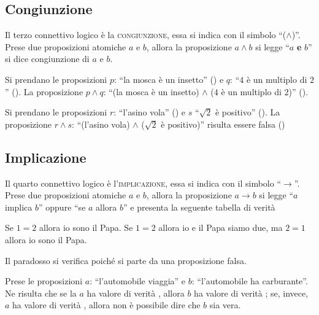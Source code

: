 \subsection{Congiunzione}\label{subsec:congiunzione}
Il terzo connettivo logico è la \textsc{congiunzione}, essa si indica con il simbolo ``(\(\land\))''. Prese due proposizioni atomiche \(a\) e \(b\), allora la proposizione \(a \land b\) si legge ``\(a\) \textbf{e} \(b\)'' si dice congiunzione di \(a\) e \(b\).



\begin{example}
    Si prendano le proposizioni \(p\): ``la mosca è un insetto'' (\true) e \(q\): ``\(4\) è un multiplo di \(2\)'' (\true). La proposizione \(p \land q\): ``(la mosca è un insetto) \(\land\) (\(4\) è un multiplo di \(2\))'' (\true).
\end{example}

\begin{example}
    Si prendano le proposizioni \(r\): ``l'asino vola'' (\false) e \(s\) ``\(\sqrt{2}\) è positivo'' (\true). La proposizione \(r \land s\): ``(l'asino vola) \(\land\) (\(\sqrt{2}\) è positivo)'' risulta essere falsa (\false)
\end{example}


\subsection{Implicazione}\label{subsec:implicazione}
Il quarto connettivo logico è l'\textsc{implicazione}, essa si indica con il simbolo ``\(\longrightarrow\)''. Prese due proposizioni atomiche \(a\) e \(b\), allora la proposizione \(a \longrightarrow b\) si legge ``\(a\) implica \(b\)'' oppure ``se \(a\) allora \(b\)'' e presenta la seguente tabella di verità



\begin{paradosso_russel}
    Se \(1 = 2\) allora io sono il Papa. Se \(1 = 2\) allora io e il Papa siamo due, ma \(2 = 1\) allora io sono il Papa.
\end{paradosso_russel}
Il paradosso si verifica poiché si parte da una proposizione falsa.

\begin{example}
    Prese le proposizioni \(a\): ``l'automobile viaggia'' e \(b\): ``l'automobile ha carburante''. Ne risulta che se la \(a\) ha valore di verità \true, allora \(b\) ha valore di verità \true{}; se, invece, \(a\) ha valore di verità \false, allora non è possibile dire che \(b\) sia vera.
\end{example}


